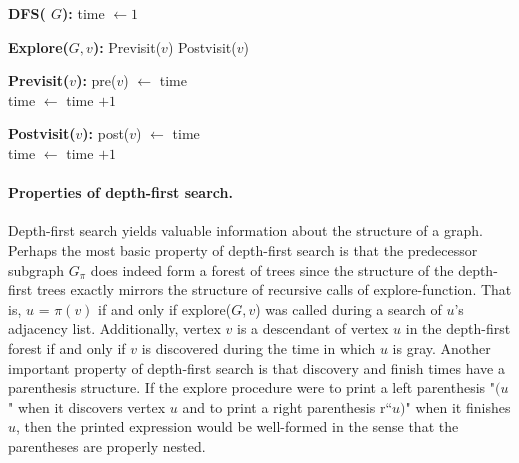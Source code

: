 \begin{minipage}{0.46\textwidth}

  \begin{algorithm}[H]
   \textbf{DFS( $G$):}
    time $ \leftarrow 1 $\\

  \end{algorithm}

  \begin{algorithm}[H]
    \textbf{Explore($G,v$):}
     Previsit($v$)
    Postvisit($v$)
  \end{algorithm}
  \end{minipage}
   \hfill
\begin{minipage}{0.46\textwidth}
  \begin{algorithm}[H]
    \textbf{Previsit($v$):}
    pre($v$) $\leftarrow $ time \\
    time $\leftarrow$ time $+1$
  \end{algorithm}
  \begin{algorithm}[H]
   \textbf{Postvisit($v$):} 
    post($v$) $\leftarrow $ time \\
    time $\leftarrow$ time $+1$
  \end{algorithm}

  \end{minipage}

\paragraph{Properties of depth-first search.} Depth-first search yields valuable information about the structure of a graph. Perhaps the most basic property of depth-first search is that the predecessor subgraph $G_{\pi}$ does indeed form a forest of trees since the structure of the depth-first trees exactly mirrors the structure of recursive calls of explore-function. That is, $u$ = $\pi\left( v \right)$ if and only if explore($G, v$) was called during a search of $ u$'s adjacency list. Additionally, vertex $v$ is a descendant of vertex $u$ in the depth-first forest if and only if $v$ is discovered during the time in which $u$ is gray.
Another important property of depth-first search is that discovery and finish times have a parenthesis structure. If the explore procedure were to print a left parenthesis "$(u$" when it discovers vertex $u$ and to print a right parenthesis r``$u)$" when it finishes $u$, then the printed expression would be well-formed in the sense that the parentheses are properly nested.

